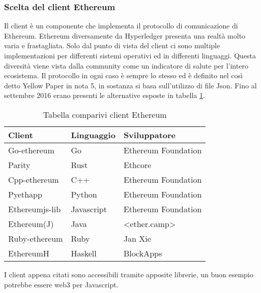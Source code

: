 \subsubsection{Scelta del client Ethereum}
Il client è un componente che implementa il protocollo di comunicazione di Ethereum. Ethereum diversamente da Hyperledger presenta una realtà molto varia e frastagliata. Solo dal punto di vista del client ci sono multiple implementazioni per differenti sistemi operativi ed in differenti linguaggi. Questa diversità viene vista dalla community come un indicatore di salute per l’intero ecosistema. Il protocollo in ogni caso è sempre lo stesso ed è definito nel così detto Yellow Paper in nota 5, in sostanza si basa sull’utilizzo di file Json. 
Fino al settembre 2016 erano presenti le alternative esposte in tabella \ref{tab:comp-client}.
\begin{table}[!h] %
    \caption{Tabella comparivi client Ethereum}
    \label{tab:comp-client}
    \begin{tabularx}{\textwidth}{|X|X|X|}
    \hline
    \textbf{Client} & \textbf{Linguaggio} & \textbf{Sviluppatore}\\
    \hline
    Go-ethereum   & Go & Ethereum Foundation \\
    \hline
    Parity   & Rust & Ethcore \\
    \hline
    Cpp-ethereum   & C++ & Ethereum Foundation\\
    \hline
    Pyethapp  & Python & Ethereum Foundation\\
    \hline
    Ethereumjs-lib  & Javascript & Ethereum Foundation\\
    \hline
    Ethereum(J)  & Java & <ether.camp>\\
    \hline
    Ruby-ethereum  & Ruby & Jan Xie\\
    \hline
    EthereumH  & Haskell & BlockApps\\
    \hline
    \end{tabularx}
\end{table}%
I client appena citati sono accessibili tramite apposite librerie, un buon esempio potrebbe essere web3 per Javascript.
